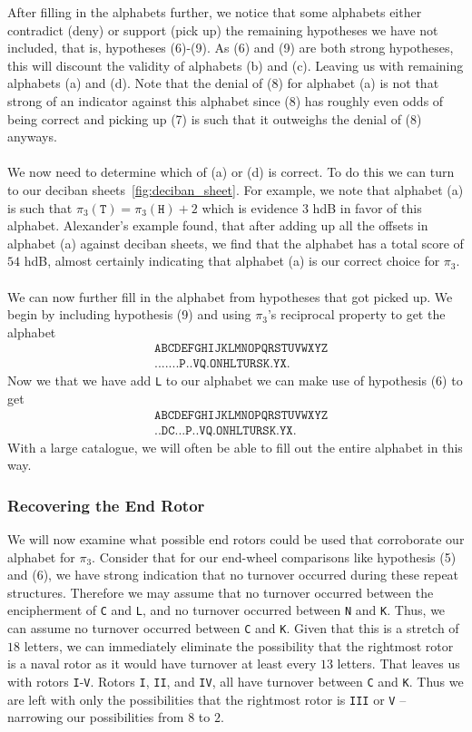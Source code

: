 \noindent  After filling in the alphabets further, we notice that
some alphabets either contradict (deny) or support (pick up) the
remaining hypotheses we have not included, that is, hypotheses
(6)-(9). As (6) and (9) are both strong hypotheses, this will
discount the validity of alphabets (b) and (c). Leaving us with
remaining alphabets (a) and (d). Note that the denial of (8) for
alphabet (a) is not that strong of an indicator against this
alphabet since (8) has roughly even odds of being correct and
picking up (7) is such that it outweighs the denial of (8) anyways.
\\\\We now need to determine which of (a) or (d) is correct. To do
this we can turn to our deciban sheets~\ref{fig:deciban_sheet}. For
example, we note that alphabet (a) is such that $\pi_3(\texttt{T}) =
\pi_3(\texttt{H}) + 2$ which is evidence $3$ hdB in favor of this
alphabet. Alexander's example found, that after adding up all the
offsets in alphabet (a) against deciban sheets, we find that the
alphabet has a total score of $54$ hdB, almost certainly indicating
that alphabet (a) is our correct choice for $\pi_3$.
\\\\We can now further fill in the alphabet from hypotheses that
got picked up. We begin by including hypothesis (9) and using
$\pi_3$'s reciprocal property to get the alphabet
\begin{align*}
  & \texttt{ABCDEFGHIJKLMNOPQRSTUVWXYZ} \\
  & \texttt{.......P..VQ.ONHLTURSK.YX.}
\end{align*}
Now we that we have add \texttt{L} to our alphabet we can make use
of hypothesis (6) to get
\begin{align*}
  & \texttt{ABCDEFGHIJKLMNOPQRSTUVWXYZ} \\
  & \texttt{..DC...P..VQ.ONHLTURSK.YX.}
\end{align*}
With a large catalogue, we will often be able to fill out the
entire alphabet in this way.

\subsubsection{Recovering the End Rotor}
We will now examine what possible end rotors could be used that
corroborate our alphabet for $\pi_3$. Consider that for our
end-wheel comparisons like hypothesis (5) and (6), we have strong
indication that no turnover occurred during these repeat
structures. Therefore we may assume that no turnover occurred
between the encipherment of \texttt{C} and \texttt{L}, and no
turnover occurred between \texttt{N} and \texttt{K}. Thus, we can
assume no turnover occurred between \texttt{C} and \texttt{K}.
Given that this is a stretch of $18$ letters, we can immediately
eliminate the possibility that the rightmost rotor is a naval rotor
as it would have turnover at least every $13$ letters. That leaves
us with rotors \texttt{I}-\texttt{V}. Rotors \texttt{I},
\texttt{II}, and \texttt{IV}, all have turnover between \texttt{C}
and \texttt{K}. Thus we are left with only the possibilities that
the rightmost rotor is \texttt{III} or \texttt{V} -- narrowing our
possibilities from $8$ to $2$.

